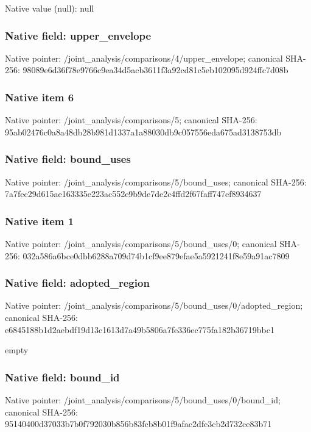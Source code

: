 \documentclass[10pt,a4paper]{article}
\begin{document}
Native value (null): null

\subsubsection{Native field: upper\_\allowbreak{}envelope}
Native pointer: /joint\_\allowbreak{}analysis/comparisons/4/upper\_\allowbreak{}envelope; canonical SHA-256: 98089e6d36f78e9766c9ea34d5acb3611f3a92cd81c5eb102095d924ffc7d08b

\begingroup\raggedright{}\par\endgroup

\subsubsection{Native item 6}
Native pointer: /joint\_\allowbreak{}analysis/comparisons/5; canonical SHA-256: 95ab02476c0a8a48db28b981d1337a1a88030db9c057556eda675ad3138753db

\subsubsection{Native field: bound\_\allowbreak{}uses}
Native pointer: /joint\_\allowbreak{}analysis/comparisons/5/bound\_\allowbreak{}uses; canonical SHA-256: 7a7fec29d615ae163335e223ac552e9b9de7de2c4ffd2f67faff747ef8934637

\subsubsection{Native item 1}
Native pointer: /joint\_\allowbreak{}analysis/comparisons/5/bound\_\allowbreak{}uses/0; canonical SHA-256: 032a586a6bce0dbb6288a709d74b1cf9ee879efae5a5921241f8e59a91ac7809

\subsubsection{Native field: adopted\_\allowbreak{}region}
Native pointer: /joint\_\allowbreak{}analysis/comparisons/5/bound\_\allowbreak{}uses/0/adopted\_\allowbreak{}region; canonical SHA-256: e6845188b1d2aebdf19d13c1613d7a49b5806a7fe336ec775fa182b36719bbc1

\begingroup\raggedright\sloppy empty\par\endgroup

\subsubsection{Native field: bound\_\allowbreak{}id}
Native pointer: /joint\_\allowbreak{}analysis/comparisons/5/bound\_\allowbreak{}uses/0/bound\_\allowbreak{}id; canonical SHA-256: 95140400d37033b7b0f792030b856b83fcb8b01f9afac2dfc3cb2d732ce83b71
\end{document}
